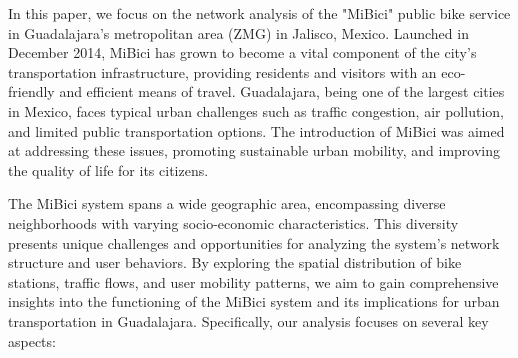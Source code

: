 \documentclass[conference]{IEEEtran}
\begin{document}
In this paper, we focus on the network analysis of the "MiBici" public bike service in Guadalajara's metropolitan area (ZMG) in Jalisco, Mexico. Launched in December 2014, MiBici has grown to become a vital component of the city’s transportation infrastructure, providing residents and visitors with an eco-friendly and efficient means of travel. Guadalajara, being one of the largest cities in Mexico, faces typical urban challenges such as traffic congestion, air pollution, and limited public transportation options. The introduction of MiBici was aimed at addressing these issues, promoting sustainable urban mobility, and improving the quality of life for its citizens.

The MiBici system spans a wide geographic area, encompassing diverse neighborhoods with varying socio-economic characteristics. This diversity presents unique challenges and opportunities for analyzing the system's network structure and user behaviors. By exploring the spatial distribution of bike stations, traffic flows, and user mobility patterns, we aim to gain comprehensive insights into the functioning of the MiBici system and its implications for urban transportation in Guadalajara. Specifically, our analysis focuses on several key aspects:
\end{document}

